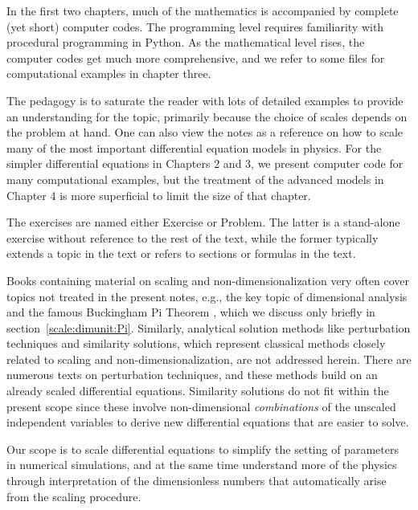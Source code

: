 \documentclass[graybox,envcountchap,sectrefs,final]{svmonodo}
\newenvironment{warning_mdfboxadmon}[1][]{
\begin{warning_mdfboxmdframed}[frametitle=#1]
}
{
\end{warning_mdfboxmdframed}
}
\begin{document}
In the first two chapters, much of the mathematics is accompanied
by complete (yet short) computer codes. The programming level requires
familiarity with procedural programming in Python. As the mathematical
level rises, the computer codes get much more comprehensive, and we refer
to some files for computational examples in chapter three.

The pedagogy is to saturate the reader with lots of detailed examples to
provide an understanding for the topic, primarily because the choice
of scales depends on the problem at hand. One can also view the notes
as a reference on how to scale many of the most important differential
equation models in physics.  For the simpler differential equations in
Chapters 2 and 3, we present computer code for many computational
examples, but the treatment of the advanced models in Chapter 4 is
more superficial to limit the size of that chapter.

The exercises are named either Exercise or Problem. The latter is
a stand-alone exercise without reference to the rest of the text, while
the former typically extends a topic in the text or refers to sections or
formulas in the text.


\begin{warning_mdfboxadmon}
Books containing material on
scaling and non-dimensionalization very often cover
topics not treated in the present notes, e.g., the key topic of
dimensional analysis and the famous Buckingham Pi Theorem
\cite{Douglas_et_al_1979,Logan_1987}, which we discuss only briefly in
section~\ref{scale:dimunit:Pi}. Similarly,
analytical solution methods like perturbation techniques
and similarity solutions, which represent classical methods
closely related to scaling and non-dimensionalization, are not
addressed herein.
There are numerous texts on perturbation techniques, and these methods
build on an already scaled differential equations. Similarity
solutions do not fit within the present scope since these involve
non-dimensional \emph{combinations} of the unscaled independent variables to derive
new differential equations that are easier to solve.

Our scope is to scale differential
equations to simplify the setting of parameters in numerical simulations,
and at the same time understand more of the physics
through interpretation of the dimensionless numbers that automatically
arise from the scaling procedure.
\end{warning_mdfboxadmon}
\end{document}
